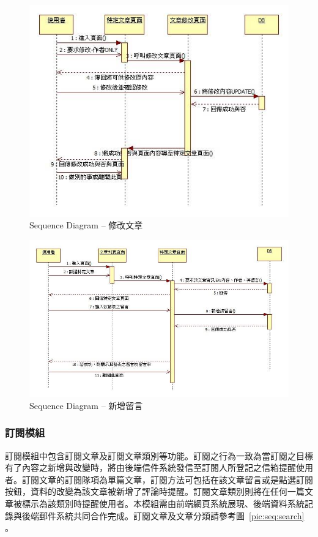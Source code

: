 \begin{figure}[H]
\centering
\includegraphics[width=.8\textwidth]{img/useseq/stage2/seqEditArticle.jpg}
\caption{Sequence Diagram -- 修改文章}
\label{pic:seq:editArticle}
\end{figure}

\begin{figure}[H]
\centering
\includegraphics[width=1.05\textwidth]{img/useseq/stage2/seqNewComment.jpg}
\caption{Sequence Diagram -- 新增留言}
\label{pic:seq:newComment}
\end{figure}

\subsubsection{訂閱模組}
\label{sssec:subscription}
訂閱模組中包含訂閱文章及訂閱文章類別等功能。訂閱之行為一致為當訂閱之目標有了內容之新增與改變時，將由後端信件系統發信至訂閱人所登記之信箱提醒使用者。訂閱文章的訂閱隊項為單篇文章，訂閱方法可包括在該文章留言或是點選訂閱按鈕，資料的改變為該文章被新增了評論時提醒。訂閱文章類別則將在任何一篇文章被標示為該類別時提醒使用者。本模組需由前端網頁系統展現、後端資料系統記錄與後端郵件系統共同合作完成。訂閱文章及文章分類請參考圖~\ref{pic:seq:search} 。


